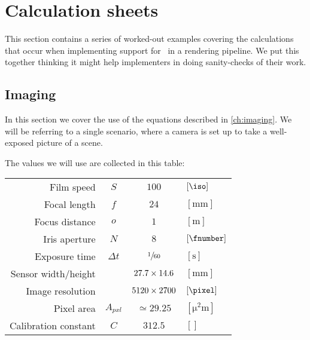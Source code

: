 
\chapter{Calculation sheets}\label{ch:calcsheets}

This section contains a series of worked-out examples covering the calculations that occur
when implementing support for \physLight\ in a rendering pipeline.
We put this together thinking it might help implementers in doing sanity-checks 
of their work.

\section{Imaging}\label{ch:calc_calibration}

In this section we cover the use of the equations described in \cref{ch:imaging}.
We will be referring to a single scenario, where a camera is set up to take a 
well-exposed picture of a scene.

The values we will use are collected in this table:

\vskip 2mm
\begin{center}
	\begin{tabular}{r c c l}
		Film speed           & $S$ & $\num{100}$ & $[\unit{\iso}]$ \\
		Focal length         & $f$ & $\num{24}$ & $[\unit{\milli\meter}]$ \\
		Focus distance       & $o$ & $\num{1}$ & $[\unit{\meter}]$ \\
		Iris aperture        & $N$ & $\num{8}$ & $[\unit{\fnumber}]$ \\
		Exposure time        & $\Delta t$ & $\sfrac1{60}$ & $[\unit{\second}]$ \\
		Sensor width/height  & & $\numproduct{27.7 x 14.6}$ & $[\unit{\milli\meter}]$ \\
		Image resolution     & & $\numproduct{5120 x 2700}$ & $[\unit{\pixel}]$  \\
		Pixel area           & $A_{pxl}$ & $\simeq \num{29.25}$ & $[\unit{\square\micro\meter}]$ \\
		Calibration constant & $C$ & $312.5$ & $[]$ \\
	\end{tabular}
\end{center}

\vskip 2mm


